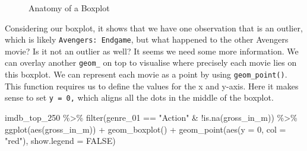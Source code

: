 \documentclass[
  letterpaper,
]{krantz}
\makeatletter
\newenvironment{Shaded}{\begin{snugshade}}{\end{snugshade}}
\newcommand{\AttributeTok}[1]{\textcolor[rgb]{0.40,0.45,0.13}{#1}}
\newcommand{\ConstantTok}[1]{\textcolor[rgb]{0.56,0.35,0.01}{#1}}
\newcommand{\DecValTok}[1]{\textcolor[rgb]{0.68,0.00,0.00}{#1}}
\newcommand{\FunctionTok}[1]{\textcolor[rgb]{0.28,0.35,0.67}{#1}}
\newcommand{\NormalTok}[1]{\textcolor[rgb]{0.00,0.23,0.31}{#1}}
\newcommand{\SpecialCharTok}[1]{\textcolor[rgb]{0.37,0.37,0.37}{#1}}
\newcommand{\StringTok}[1]{\textcolor[rgb]{0.13,0.47,0.30}{#1}}
\newenvironment{kframe}{%
\medskip{}
\setlength{\fboxsep}{.8em}
 \def\at@end@of@kframe{}%
 \ifinner\ifhmode%
  \def\at@end@of@kframe{\end{minipage}}%
  \begin{minipage}{\columnwidth}%
 \fi\fi%
 \def\FrameCommand##1{\hskip\@totalleftmargin \hskip-\fboxsep
 \colorbox{shadecolor}{##1}\hskip-\fboxsep
     \hskip-\linewidth \hskip-\@totalleftmargin \hskip\columnwidth}%
 \MakeFramed {\advance\hsize-\width
   \@totalleftmargin\z@ \linewidth\hsize
   \@setminipage}}%
 {\par\unskip\endMakeFramed%
 \at@end@of@kframe}
\renewenvironment{Shaded}{\begin{kframe}}{\end{kframe}}
\makeatother
\begin{document}
\begin{figure}


\caption{\label{fig-anatomy-of-a-boxplot}Anatomy of a Boxplot}

\end{figure}%

Considering our boxplot, it shows that we have one observation that is
an outlier, which is likely \texttt{Avengers:\ Endgame}, but what
happened to the other Avengers movie? Is it not an outlier as well? It
seems we need some more information. We can overlay another
\texttt{geom\_} on top to visualise where precisely each movie lies on
this boxplot. We can represent each movie as a point by using
\texttt{geom\_point()}. This function requires us to define the values
for the x and y-axis. Here it makes sense to set \texttt{y\ =\ 0,} which
aligns all the dots in the middle of the boxplot.

\begin{Shaded}
\begin{Highlighting}[]
\NormalTok{imdb\_top\_250 }\SpecialCharTok{\%\textgreater{}\%}
  \FunctionTok{filter}\NormalTok{(genre\_01 }\SpecialCharTok{==} \StringTok{"Action"} \SpecialCharTok{\&} \SpecialCharTok{!}\FunctionTok{is.na}\NormalTok{(gross\_in\_m)) }\SpecialCharTok{\%\textgreater{}\%}
  \FunctionTok{ggplot}\NormalTok{(}\FunctionTok{aes}\NormalTok{(gross\_in\_m)) }\SpecialCharTok{+}
  \FunctionTok{geom\_boxplot}\NormalTok{() }\SpecialCharTok{+}
  \FunctionTok{geom\_point}\NormalTok{(}\FunctionTok{aes}\NormalTok{(}\AttributeTok{y =} \DecValTok{0}\NormalTok{, }\AttributeTok{col =} \StringTok{"red"}\NormalTok{),}
             \AttributeTok{show.legend =} \ConstantTok{FALSE}\NormalTok{)}
\end{Highlighting}
\end{Shaded}
\end{document}

